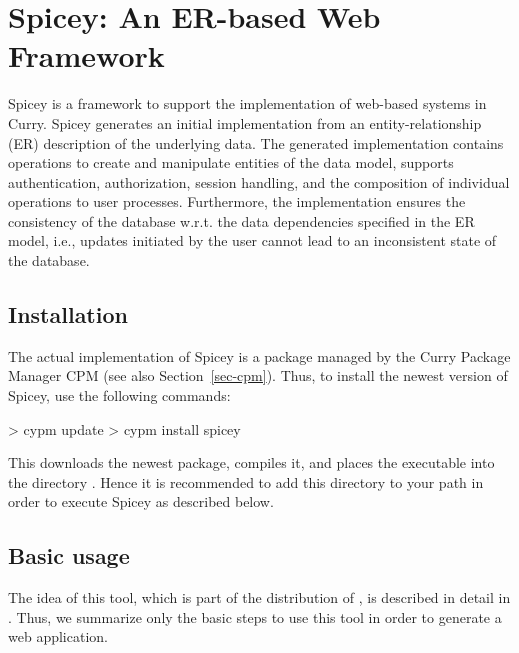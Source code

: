 \section{Spicey: An ER-based Web Framework}
\label{sec-spicey}

Spicey is a framework to support the implementation of
web-based systems in Curry. Spicey generates an initial implementation
from an entity-relationship (ER) description of the underlying
data. The generated implementation contains operations to create and
manipulate entities of the data model, supports authentication,
authorization, session handling, and the composition of individual
operations to user processes. Furthermore, the implementation ensures
the consistency of the database w.r.t. the data dependencies specified
in the ER model, i.e., updates initiated by the user cannot lead to an
inconsistent state of the database.

\subsection{Installation}

The actual implementation of Spicey is a package
managed by the Curry Package Manager CPM
(see also Section~\ref{sec-cpm}).
Thus, to install the newest version of Spicey, use the following commands:
%
\begin{curry}
> cypm update
> cypm install spicey
\end{curry}
%
This downloads the newest package, compiles it, and places
the executable  into the directory .
Hence it is recommended to add this directory to your path
in order to execute Spicey as described below.

\subsection{Basic usage}

The idea of this tool, which is part of the distribution of \CYS,
is described in detail in \cite{HanusKoschnicke14TPLP}.
Thus, we summarize only the basic steps to use this tool
in order to generate a web application.

